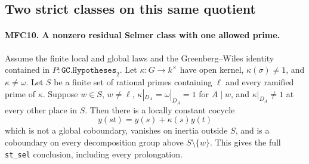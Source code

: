\subsection{Two strict classes on this same quotient}

\paragraph{MFC10. A nonzero residual Selmer class with one allowed prime.}
\label{claim:MFC10}
Assume the finite local and global laws and the Greenberg--Wiles
identity contained in \(P:\texttt{GC.Hypotheses}_{2}\).
Let \(\kappa:G\to k^\times\) have open kernel,
\(\kappa(\sigma)\ne1\), and \(\kappa\ne\omega\).
Let \(S\) be a finite set of rational primes containing
\(\ell\) and every ramified prime of \(\kappa\).
Suppose \(w\in S\), \(w\ne\ell\),
\(\kappa|_{D_A}=\omega|_{D_A}=1\) for \(A\mid w\),
and \(\kappa|_{D_A}\ne1\) at every other place in \(S\).
Then there is a locally constant cocycle
\[
 y(st)=y(s)+\kappa(s)y(t)                                  \tag{MFC.24}
\]
which is not a global coboundary, vanishes on inertia outside
\(S\), and is a coboundary on every decomposition group above
\(S\setminus\{w\}\).  This gives the full
\texttt{st\_sel} conclusion, including every prolongation.


